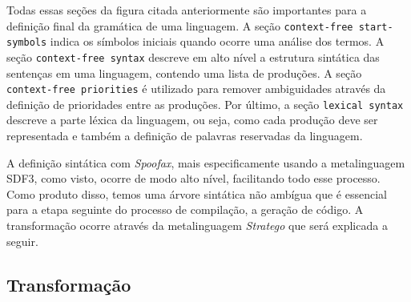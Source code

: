 Todas essas seções da figura citada anteriormente são importantes para a definição final da gramática de uma linguagem. A seção \textit{} \texttt{context-free start-symbols} indica os símbolos iniciais quando ocorre uma análise dos termos. A seção \texttt{context-free syntax} descreve em alto nível a estrutura sintática das sentenças em uma linguagem, contendo uma lista de produções. A seção \texttt{context-free priorities} é utilizado para remover ambiguidades através da definição de prioridades entre as produções. Por último, a seção \texttt{lexical syntax} descreve a parte léxica da linguagem, ou seja, como cada produção deve ser representada e também a definição de palavras reservadas da linguagem.

A definição sintática com \textit{Spoofax}, mais especificamente usando a metalinguagem SDF3, como visto, ocorre de modo alto nível, facilitando todo esse processo. Como produto disso, temos uma árvore sintática não ambígua que é essencial para a etapa seguinte do processo de compilação, a geração de código. A transformação ocorre através da metalinguagem \textit{Stratego} que será explicada a seguir.

\subsection{Transformação}
